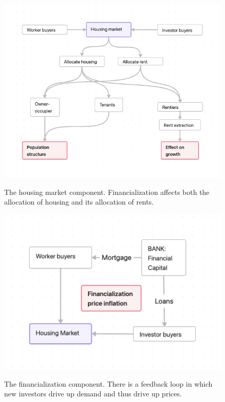 \begin{figure}[!ht]
    \centering
    \includegraphics[scale=.60]{fig/flow_impacts.png}
    \label{Figure-impacts}
\caption[The housing market component of the model.]{The housing market component. Financialization affects both  the allocation of housing and its allocation of rents.}
\end{figure}


\begin{figure}[!ht]
    \centering
    \includegraphics[scale=.70]{fig/flow_financialization.png}
    \label{fig-financial-cycle}
    \caption[The financialization component of the model.]{The financialization component. There is a feedback loop in which new investors drive up demand and thus drive up prices.}
\end{figure}

